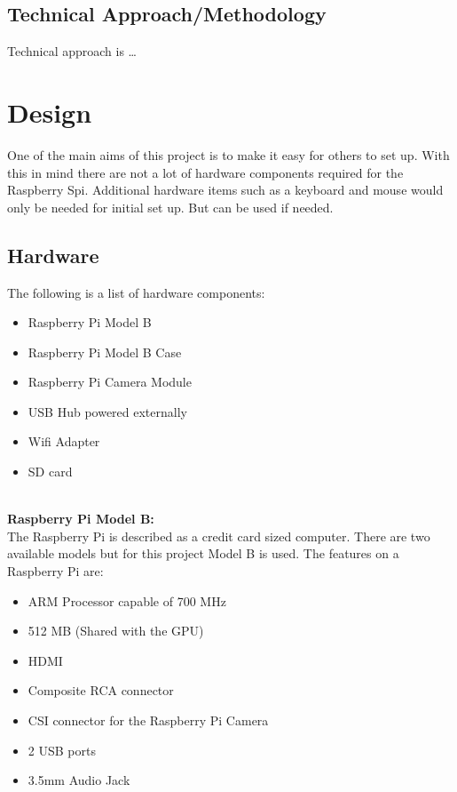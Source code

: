 \documentclass[]{report}
\begin{document}
\section {Technical Approach/Methodology}
\label {sec:tech}
Technical approach is \ldots
% 
\chapter {Design}
\label {ch:design}
	One of the main aims of this project is to make it easy for others to set up. With this in mind there are not a lot of hardware components required for the Raspberry Spi. Additional hardware items such as a keyboard and mouse would only be needed for initial set up. But can be used if needed. \\
	
\section {Hardware}	
\label {sec:hardware}

The following is a list of hardware components:\\
\begin {itemize}
  \item Raspberry Pi Model B\\
  \item Raspberry Pi Model B Case\\
  \item Raspberry Pi Camera Module\\
  \item USB Hub powered externally\\
  \item Wifi Adapter\\
  \item SD card\\
\end {itemize} 

\noindent\\
{\bf Raspberry Pi Model B:} \\
\break
The Raspberry Pi is described as a credit card sized computer. There are two available models but for this project Model B is used. The features on a Raspberry Pi are:
\begin {itemize}
  \item ARM Processor capable of 700 MHz\\
  \item 512 MB (Shared with the GPU)\\
  \item HDMI\\
  \item Composite RCA connector\\
  \item CSI connector for the Raspberry Pi Camera\\
  \item 2 USB ports\\
  \item 3.5mm Audio Jack\\
\end {itemize}
  
\end{document}

